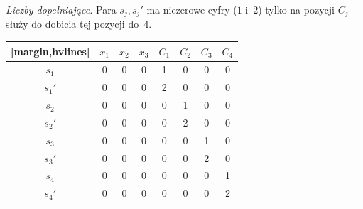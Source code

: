 \begin{example}
	\emph{Liczby dopełniające.} Para $s_j, s_j'$ ma niezerowe cyfry ($1$ i~$2$) tylko na pozycji $C_j$ -- służy do dobicia tej pozycji do~$4$.
	\begin{aztable}
		\centering
		\renewcommand{\arraystretch}{1.2}
		\begin{NiceTabular}{c|ccc|cccc}[margin,hvlines]
			       & $x_1$ & $x_2$ & $x_3$ & $C_1$ & $C_2$ & $C_3$ & $C_4$ \\
			\hline
			$s_1$  & 0     & 0     & 0     & 1     & 0     & 0     & 0     \\
			$s_1'$ & 0     & 0     & 0     & 2     & 0     & 0     & 0     \\
			$s_2$  & 0     & 0     & 0     & 0     & 1     & 0     & 0     \\
			$s_2'$ & 0     & 0     & 0     & 0     & 2     & 0     & 0     \\
			$s_3$  & 0     & 0     & 0     & 0     & 0     & 1     & 0     \\
			$s_3'$ & 0     & 0     & 0     & 0     & 0     & 2     & 0     \\
			$s_4$  & 0     & 0     & 0     & 0     & 0     & 0     & 1     \\
			$s_4'$ & 0     & 0     & 0     & 0     & 0     & 0     & 2     \\
		\end{NiceTabular}
	\end{aztable}


\end{example}
